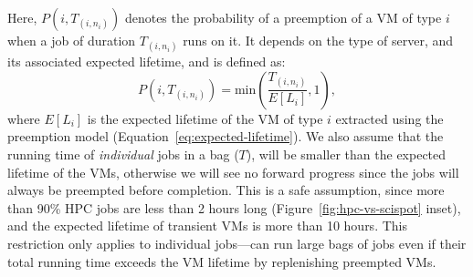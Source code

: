 Here, $P(i, T_{(i, n_i)})$ denotes the probability of a preemption of a VM of type $i$ when a job of duration $T_{(i, n_i)}$ runs on it. 
%
It depends on the type of server, and its associated expected lifetime, and is defined as:
\begin{equation}
  \label{eq:pi}
  P\left(i, T_{\left(i, n_i \right)}\right) = \text{min}\left(\dfrac{T_{(i, n_i)}}{E[L_i]}, 1\right),
\end{equation}
where $E[L_i]$ is the expected lifetime of the VM of type $i$ extracted using the preemption model (Equation~\ref{eq:expected-lifetime}).
We also assume that the running time of \emph{individual} jobs in a bag ($T$), will be smaller than the expected lifetime of the VMs, otherwise we will see no forward progress since the jobs will always be preempted before completion.
This is a safe assumption, since more than 90\% HPC jobs are less than 2 hours long (Figure~\ref{fig:hpc-vs-scispot} inset), and the expected lifetime of transient VMs is more than 10 hours.
This restriction only applies to individual jobs---\sysname can run large bags of jobs even if their total running time exceeds the VM lifetime by replenishing preempted VMs.












